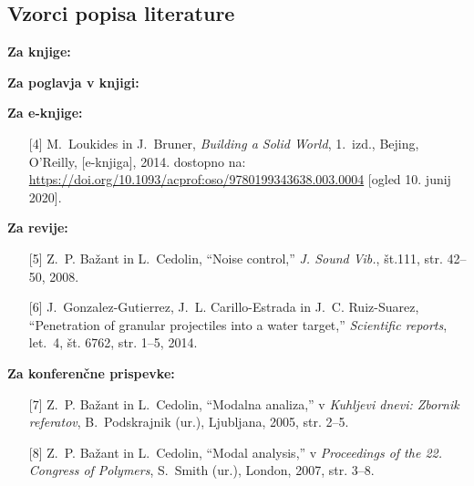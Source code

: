 \subsection{Vzorci popisa literature}\label{sec:vzorci_lit}

\textbf{Za knjige:}

\textbf{Za poglavja v knjigi:}

\textbf{Za e-knjige:}
\begin{itemize}
	\item[{[4]}] M.~Loukides in J.~Bruner, \emph{Building a Solid World}, 
	1.~izd., 
	Bejing, O'Reilly, [e-knjiga], 2014. dostopno na:
	\url{https://doi.org/10.1093/acprof:oso/9780199343638.003.0004} [ogled 10.
	junij 2020].
\end{itemize}

\textbf{Za revije:}
\begin{itemize}
	\item[{[5]}] Z.~P. Ba\v{z}ant in L.~Cedolin, ``Noise control,'' \emph{J. 
	Sound 
		Vib.}, št.111, str. 42--50, 2008.\\
	\item[{[6]}] J.~Gonzalez-Gutierrez, J.~L. Carillo-Estrada in J.~C. 
	Ruiz-Suarez,
	``Penetration of granular projectiles into a water target,'' 
	\emph{Scientific
		reports}, let.~4, št. 6762, str. 1--5, 2014.
\end{itemize}

\textbf{Za konferenčne prispevke:}
\begin{itemize}
	\item[{[7]}] Z.~P. Ba\v{z}ant in L.~Cedolin, ``Modalna analiza,'' v 
	\emph{Kuhljevi dnevi: Zbornik referatov}, B.~Podskrajnik (ur.), Ljubljana, 
	2005, str. 2--5.\\
	
	\item[{[8]}] Z.~P. Ba\v{z}ant in L.~Cedolin, ``Modal analysis,'' v 
	\emph{Proceedings of the 22. Congress of Polymers}, S.~Smith (ur.), London, 
	2007, str. 3--8.\\
\end{itemize}

